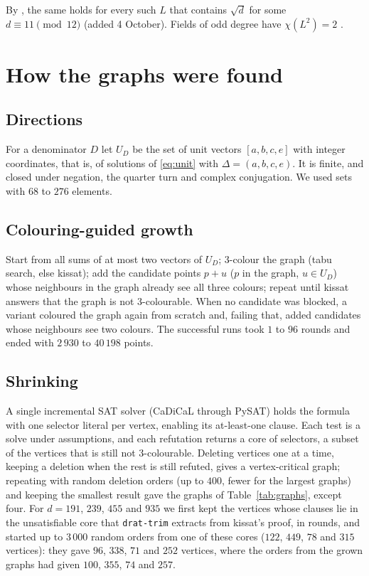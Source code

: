 \documentclass[11pt,a4paper]{amsart}
\theoremstyle{remark}
\begin{document}
By \cite{FC}, the same holds for every such $L$ that contains $\sqrt d$ for some $d\equiv11\pmod{12}$ (added
4 October). Fields of odd degree have $\chi(L^2)=2$ \cite[Theorem~7.1]{Moorhouse}.

\section{How the graphs were found}\label{sec:search}

\subsection*{Directions}
For a denominator $D$ let $U_D$ be the set of unit vectors $[a,b,c,e]$ with integer coordinates, that is, of
solutions of \eqref{eq:unit} with $\Delta=(a,b,c,e)$. It is finite, and closed under negation, the quarter
turn and complex conjugation. We used sets with $68$ to $276$ elements.

\subsection*{Colouring-guided growth}
Start from all sums of at most two vectors of $U_D$; $3$-colour the graph (tabu search, else kissat); add the
candidate points $p+u$ ($p$ in the graph, $u\in U_D$) whose neighbours in the graph already see all three
colours; repeat until kissat answers that the graph is not $3$-colourable. When no candidate was blocked, a
variant coloured the graph again from scratch and, failing that, added candidates whose neighbours see two
colours. The successful runs took $1$ to $96$ rounds and ended with $2\,930$ to $40\,198$ points.

\subsection*{Shrinking}
A single incremental SAT solver (CaDiCaL through PySAT) holds the formula with one selector literal per vertex,
enabling its at-least-one clause. Each test is a solve under assumptions, and each refutation returns a core of
selectors, a subset of the vertices that is still not $3$-colourable. Deleting vertices one at a time, keeping
a deletion when the rest is still refuted, gives a vertex-critical graph; repeating with random deletion orders
(up to $400$, fewer for the largest graphs) and keeping the smallest result gave the graphs of
Table~\ref{tab:graphs}, except four. For $d=191$, $239$, $455$ and $935$ we first kept the vertices whose
clauses lie in the unsatisfiable core that \texttt{drat-trim} extracts from kissat's proof, in rounds, and
started up to $3\,000$ random orders from one of these cores ($122$, $449$, $78$ and $315$ vertices): they
gave $96$, $338$, $71$ and $252$ vertices, where the orders from the grown graphs had given $100$, $355$, $74$
and $257$.
\end{document}
